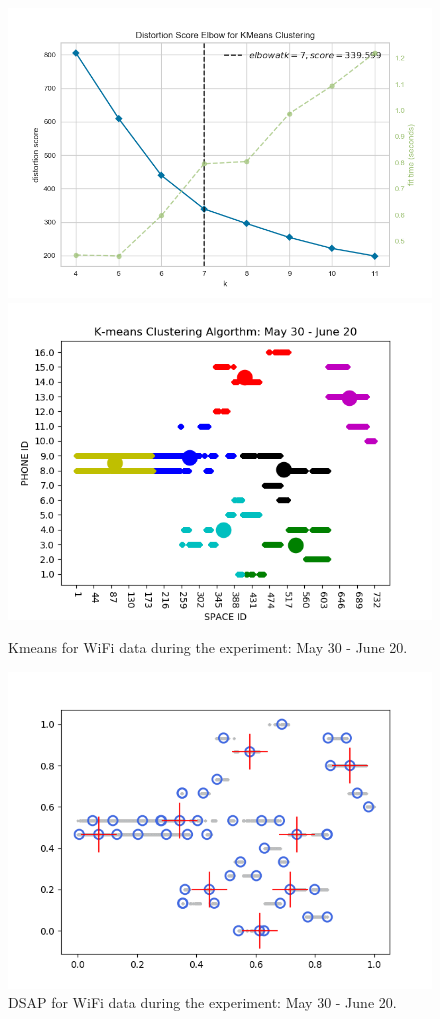 \begin{figure}[!h]
    \centering
    \includegraphics[width = 7.5 cm]{image/Chapters/Chapter6/elbowWholeWifiNormalize.png}\hfill
     \includegraphics[width = 7.5 cm]{image/Chapters/Chapter6/kmeanswifiAllDays.png}
    \\[\smallskipamount]    
    \caption{Kmeans for WiFi data during the experiment: May 30 - June 20.}
    \label{2}
\end{figure}






\begin{figure}[!h]
    \centering
    \includegraphics[width = 10 cm]{image/Chapters/Chapter6/DSAPalldays.png}
    \caption{ DSAP for WiFi data during the experiment: May 30 - June 20.}
    \label{1}
\end{figure}


